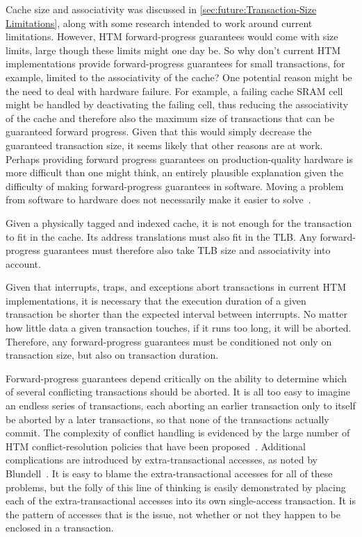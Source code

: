 Cache size and associativity was discussed in
\cref{sec:future:Transaction-Size Limitations},
along with some research intended to work around current limitations.
However, HTM forward-progress guarantees would
come with size limits, large though these limits might one day be.
So why don't current HTM implementations provide forward-progress
guarantees for small transactions, for example, limited to the
associativity of the cache?
One potential reason might be the need to deal with hardware failure.
For example, a failing cache SRAM cell might be handled by deactivating
the failing cell, thus reducing the associativity of the cache and
therefore also the maximum size of transactions that can be guaranteed
forward progress.
Given that this would simply decrease the guaranteed transaction size,
it seems likely that other reasons are at work.
Perhaps providing forward progress guarantees on production-quality
hardware is more difficult than one might think, an entirely plausible
explanation given the difficulty of making forward-progress guarantees
in software.
Moving a problem from software to hardware does not necessarily make
it easier to solve~\cite{ChristianJacobi2012MainframeTM}.

Given a physically tagged and indexed cache, it is not enough for the
transaction to fit in the cache.
Its address translations must also fit in the TLB\@.
Any forward-progress guarantees must therefore also take TLB size
and associativity into account.

Given that interrupts, traps, and exceptions abort transactions in current
HTM implementations, it is necessary that the execution duration of
a given transaction be shorter than the expected interval between
interrupts.
No matter how little data a given transaction touches, if it runs too
long, it will be aborted.
Therefore, any forward-progress guarantees must be conditioned not only
on transaction size, but also on transaction duration.

Forward-progress guarantees depend critically on the ability to determine
which of several conflicting transactions should be aborted.
It is all too easy to imagine an endless series of transactions, each
aborting an earlier transaction only to itself be aborted by a later
transactions, so that none of the transactions actually commit.
The complexity of conflict handling is
evidenced by the large number of HTM conflict-resolution policies
that have been proposed~\cite{EgeAkpinar2011HTM2TLE,YujieLiu2011ToxicTransactions}.
Additional complications are introduced by extra-transactional accesses,
as noted by Blundell~\cite{Blundell2006TMdeadlock}.
It is easy to blame the extra-transactional accesses for all of these
problems, but the folly of this line of thinking is easily demonstrated
by placing each of the extra-transactional accesses into its own
single-access transaction.
It is the pattern of accesses that is the issue, not whether or not they
happen to be enclosed in a transaction.

